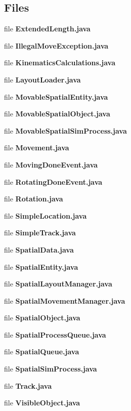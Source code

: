 \subsection*{Files}
\begin{DoxyCompactItemize}
\item 
file {\bfseries Extended\-Length.\-java}
\item 
file {\bfseries Illegal\-Move\-Exception.\-java}
\item 
file {\bfseries Kinematics\-Calculations.\-java}
\item 
file {\bfseries Layout\-Loader.\-java}
\item 
file {\bfseries Movable\-Spatial\-Entity.\-java}
\item 
file {\bfseries Movable\-Spatial\-Object.\-java}
\item 
file {\bfseries Movable\-Spatial\-Sim\-Process.\-java}
\item 
file {\bfseries Movement.\-java}
\item 
file {\bfseries Moving\-Done\-Event.\-java}
\item 
file {\bfseries Rotating\-Done\-Event.\-java}
\item 
file {\bfseries Rotation.\-java}
\item 
file {\bfseries Simple\-Location.\-java}
\item 
file {\bfseries Simple\-Track.\-java}
\item 
file {\bfseries Spatial\-Data.\-java}
\item 
file {\bfseries Spatial\-Entity.\-java}
\item 
file {\bfseries Spatial\-Layout\-Manager.\-java}
\item 
file {\bfseries Spatial\-Movement\-Manager.\-java}
\item 
file {\bfseries Spatial\-Object.\-java}
\item 
file {\bfseries Spatial\-Process\-Queue.\-java}
\item 
file {\bfseries Spatial\-Queue.\-java}
\item 
file {\bfseries Spatial\-Sim\-Process.\-java}
\item 
file {\bfseries Track.\-java}
\item 
file {\bfseries Visible\-Object.\-java}
\end{DoxyCompactItemize}
